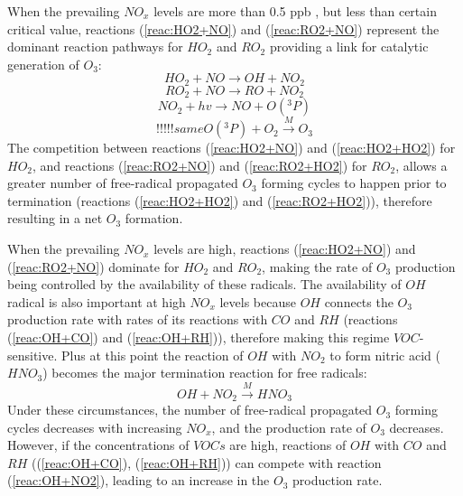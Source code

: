 \documentclass[11pt,a4paper]{article}
\begin{document}


When the prevailing $NO_x$ levels are more than 0.5 ppb \citep{Sillman1999}, but less than certain critical value, reactions (\ref{reac:HO2+NO}) and (\ref{reac:RO2+NO}) represent the dominant reaction pathways for $HO_2$ and $RO_2$ providing a link for catalytic generation of $O_3$:
\begin{equation}\label{reac:HO2+NO}
HO_2 + NO \rightarrow OH + NO_2
\end{equation}
\begin{equation}\label{reac:RO2+NO}
RO_2 + NO \rightarrow RO + NO_2
\end{equation}
\begin{equation}\label{eq:NO2+hv}
NO_2 + hv \rightarrow NO + O(^3P)
\end{equation}
\begin{equation} %
!!!!! same O(^3P) + O_2 \xrightarrow{M} O_3
\end{equation}
The competition between reactions (\ref{reac:HO2+NO}) and (\ref{reac:HO2+HO2}) for $HO_2$, and reactions (\ref{reac:RO2+NO}) and (\ref{reac:RO2+HO2}) for $RO_2$, allows a greater number of free-radical propagated $O_3$ forming cycles to happen prior to termination (reactions (\ref{reac:HO2+HO2}) and (\ref{reac:RO2+HO2})), therefore resulting in a net $O_3$ formation. 

When the prevailing $NO_x$ levels are high, reactions (\ref{reac:HO2+NO}) and (\ref{reac:RO2+NO}) dominate for $HO_2$ and $RO_2$, making the rate of $O_3$ production being controlled by the availability of these radicals. The availability of $OH$ radical is also important at high $NO_x$ levels because $OH$ connects the $O_3$ production rate with rates of its reactions with $CO$ and $RH$ (reactions (\ref{reac:OH+CO}) and (\ref{reac:OH+RH})), therefore making this regime $VOC$-sensitive. Plus at this point the reaction of $OH$ with $NO_2$ to form nitric acid ($HNO_3$) becomes the major termination reaction for free radicals:
\begin{equation}\label{reac:OH+NO2}
OH + NO_2 \xrightarrow{M} HNO_3
\end{equation}
Under these circumstances, the number of free-radical propagated $O_3$ forming cycles decreases with increasing $NO_x$, and the production rate of $O_3$ decreases. However, if the concentrations of $VOCs$ are high, reactions of $OH$ with $CO$ and $RH$ ((\ref{reac:OH+CO}), (\ref{reac:OH+RH})) can compete with reaction (\ref{reac:OH+NO2}), leading to an increase in the $O_3$ production rate.
\end{document}
